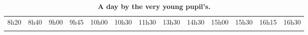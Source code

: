 \begin{landscape}
\begin{table}
	\shorthandoff{-}
	\begin{tabular}{
	|p{10mm}
	|p{10mm}
	|p{23mm}
	|p{8mm}
	|p{15mm}
	|p{27mm}
	|p{18mm} %
	|p{30mm}
	|p{15mm}
	|p{15mm}
	|p{23mm}
	|p{7mm}
	|p{0mm}}
		\multicolumn{1}{l}{\hspace{-5mm}8h20} & 
		\multicolumn{1}{l}{\hspace{-5mm}8h40} &  	%
		\multicolumn{1}{l}{\hspace{-5mm}9h00} &  	%
		\multicolumn{1}{l}{\hspace{-5mm}9h45} & 	%
		\multicolumn{1}{l}{\hspace{-8mm}10h00} & 	%
		\multicolumn{1}{l}{\hspace{-8mm}10h30} &  	%
		\multicolumn{1}{l}{\hspace{-8mm}11h30} &  	%
		\multicolumn{1}{l}{\hspace{-8mm}13h30} &  	%
		\multicolumn{1}{l}{\hspace{-8mm}14h30} &  	%
		\multicolumn{1}{l}{\hspace{-8mm}15h00} & 	%
		\multicolumn{1}{l}{\hspace{-8mm}15h30} &  	%
		\multicolumn{1}{l}{\hspace{-8mm}16h15} &  	%
		\multicolumn{1}{l}{\hspace{-8mm}16h30}  \\ 	%
		\cline{1-6}\cline{8-12}
		 & & & & \cellcolor{gray!50} & & & & &  \cellcolor{gray!50}& & &
		 \multicolumn{1}{l}{} \\ [15mm]
		 \cline{1-6}\cline{8-12}
	\end{tabular}
	\hfill
	\caption{\textbf{A day by the very young pupil's.}}
\end{table}


\end{landscape}
